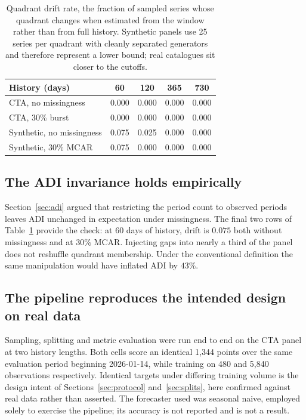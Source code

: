 \documentclass[11pt]{article}
\begin{document}
\begin{table}[h]
\centering
\caption{Quadrant drift rate, the fraction of sampled series whose quadrant
changes when estimated from the window rather than from full history. Synthetic
panels use 25 series per quadrant with cleanly separated generators and therefore
represent a lower bound; real catalogues sit closer to the cutoffs.}
\label{tab:drift}
\small
\begin{tabular}{lcccc}
\toprule
History (days) & 60 & 120 & 365 & 730 \\
\midrule
CTA, no missingness            & 0.000 & 0.000 & 0.000 & 0.000 \\
CTA, 30\% burst                & 0.000 & 0.000 & 0.000 & 0.000 \\
Synthetic, no missingness      & 0.075 & 0.025 & 0.000 & 0.000 \\
Synthetic, 30\% MCAR           & 0.075 & 0.000 & 0.000 & 0.000 \\
\bottomrule
\end{tabular}
\end{table}

\subsection{The ADI invariance holds empirically}

Section~\ref{sec:adi} argued that restricting the period count to observed
periods leaves ADI unchanged in expectation under missingness. The final two rows
of Table~\ref{tab:drift} provide the check: at 60 days of history, drift is
$0.075$ both without missingness and at $30\%$ MCAR. Injecting gaps into nearly a
third of the panel does not reshuffle quadrant membership. Under the conventional
definition the same manipulation would have inflated ADI by $43\%$.

\subsection{The pipeline reproduces the intended design on real data}

Sampling, splitting and metric evaluation were run end to end on the CTA panel at
two history lengths. Both cells score an identical 1{,}344 points over the same
evaluation period beginning 2026-01-14, while training on 480 and 5{,}840
observations respectively. Identical targets under differing training volume is
the design intent of Sections~\ref{sec:protocol} and~\ref{sec:splits}, here
confirmed against real data rather than asserted. The forecaster used was
seasonal naive, employed solely to exercise the pipeline; its accuracy is not
reported and is not a result.
\end{document}
